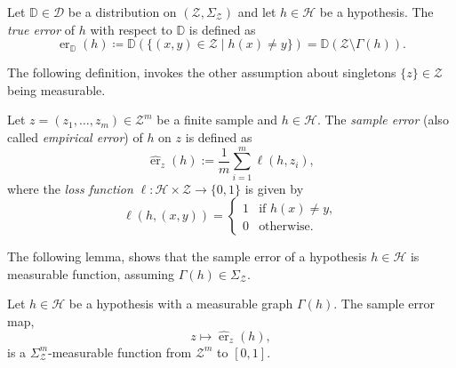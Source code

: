 \begin{definition}
    Let $\mathbb{D} \in \mathcal{D}$ be a distribution on $(\mathcal{Z},\Sigma_{\mathcal{Z}})$
    and let $h \in \mathcal{H}$ be a hypothesis.
    The \emph{true error} of $h$ with respect to $\mathbb{D}$ is defined as
    \[
        \operatorname{er}_{\mathbb{D}}(h) \coloneqq \mathbb{D}(\{(x,y)\in\mathcal{Z} \mid h(x)\neq y\}) = \mathbb{D}(\mathcal{Z}\setminus\Gamma(h)).
    \]
\end{definition}


\medskip

The following definition, invokes the other assumption about singletons $\{z\}\in \mathcal{Z}$ being measurable.

\begin{definition}
    Let $z = (z_1,\dots,z_m)\in\mathcal{Z}^m$ be a finite sample and $h\in\mathcal{H}$.
    The \emph{sample error} (also called \emph{empirical error}) of $h$ on $z$ is defined as
    \[
        \hat{\operatorname{er}}_{z}(h) := \frac{1}{m}\sum_{i=1}^m \ell(h,z_i),
    \]
    where the \emph{loss function} $\ell:\mathcal{H}\times \mathcal{Z}\to\{0,1\}$ is given by
    \[
        \ell(h,(x,y)) =
        \begin{cases}
            1 & \text{if } h(x)\neq y, \\
            0 & \text{otherwise}.
        \end{cases}
    \]
\end{definition}

The following lemma, shows that the sample error of a hypothesis $h \in \mathcal{H}$ is measurable function, assuming $\Gamma(h) \in \Sigma_{\mathcal{Z}}$.

\begin{lemma}
    \label{lem:sample-error-measurable}
    Let $h \in \mathcal{H}$ be a hypothesis with a measurable graph $\Gamma(h)$. The sample error map,
    \[
        z \mapsto \hat{\operatorname{er}}_{z}(h),
    \]
    is a $\Sigma_{\mathcal{Z}}^m$-measurable function from $\mathcal{Z}^m$ to $[0,1]$.
\end{lemma}

